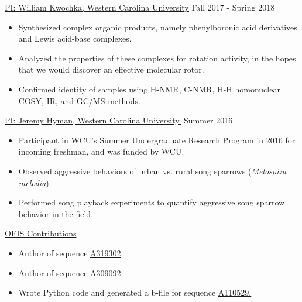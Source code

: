\href{https://www.wcu.edu/learn/departments-schools-colleges/cas/science-and-math/chemphys/faculty-and-staff/william-r.-kwochka.aspx}{\ul{PI: William Kwochka, Western Carolina University}} \hfill Fall 2017 - Spring 2018
\begin{itemize}[noitemsep]
\item Synthesized complex organic products, namely phenylboronic acid derivatives and Lewis acid-base complexes.
\item Analyzed the properties of these complexes for rotation activity, in the hopes that we would discover an effective molecular rotor.
\item Confirmed identity of samples using H-NMR, C-NMR, H-H homonuclear COSY, IR, and GC/MS methods.
\end{itemize}

\href{https://www.wcu.edu/learn/departments-schools-colleges/cas/science-and-math/biology/biology-faculty-staff/jeremy-hyman.aspx}{\ul{PI: Jeremy Hyman, Western Carolina University.}} \hfill Summer 2016
\begin{itemize}[noitemsep]
\item Participant in WCU's Summer Undergraduate Research Program in 2016 for incoming freshman, and was funded by WCU.
\item Observed aggressive behaviors of urban vs. rural song sparrows ({\it Melospiza melodia}).
\item Performed song playback experiments to quantify aggressive song sparrow behavior in the field.
\end{itemize}

\ul{OEIS Contributions}
\begin{itemize}[noitemsep]
\item Author of sequence \href{https://oeis.org/A319302}{\ul{A319302}}.
\item Author of sequence \href{https://oeis.org/A309092}{\ul{A309092}}.
\item Wrote Python code and generated a b-file for sequence \href{https://oeis.org/A110529}{\ul{A110529}.}
\end{itemize}